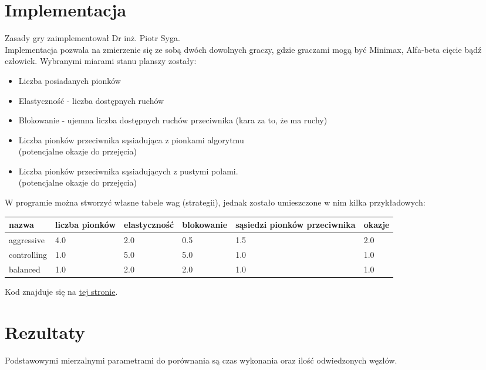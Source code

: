 \documentclass[12pt, a4paper]{article}
\begin{document}
\section{Implementacja}
Zasady gry zaimplementował Dr inż. Piotr Syga\cite{reversiimpl}. \\
Implementacja pozwala na zmierzenie się ze sobą dwóch dowolnych graczy,
gdzie graczami mogą być Minimax, Alfa-beta cięcie bądź człowiek.
Wybranymi miarami stanu planszy zostały:
\begin{itemize}
    \item Liczba posiadanych pionków
    \item Elastyczność - liczba dostępnych ruchów
    \item Blokowanie - ujemna liczba dostępnych ruchów przeciwnika (kara za to, że ma ruchy)
    \item Liczba pionków przeciwnika sąsiadująca z pionkami algorytmu \\
    (potencjalne okazje do przejęcia)
    \item Liczba pionków przeciwnika sąsiadujących z pustymi polami. \\
    (potencjalne okazje do przejęcia)
\end{itemize}
W programie można stworzyć własne tabele wag (strategii),
jednak zostało umieszczone w nim kilka przykładowych:
\begin{center}
    \begin{tabular}{| m{5em} | m{4em} | m{5.5em} | m{5em} | m{4em} | m{3em} |}
        \hline
        nazwa & liczba pionków & elastyczność & blokowanie & sąsiedzi pionków przeciwnika & okazje \\
        \hline
        aggressive & 4.0 & 2.0 & 0.5 & 1.5 & 2.0 \\
        \hline
        controlling & 1.0 & 5.0 & 5.0 & 1.0 & 1.0 \\
        \hline
        balanced & 1.0 & 2.0 & 2.0 & 1.0 & 1.0 \\
        \hline
    \end{tabular}
\end{center}

Kod znajduje się na \href{https://github.com/qriaa/sem6-si/tree/main/lista2}{tej stronie}.

\section{Rezultaty}
Podstawowymi mierzalnymi parametrami do porównania
są czas wykonania oraz ilość odwiedzonych węzłów.
\end{document}
